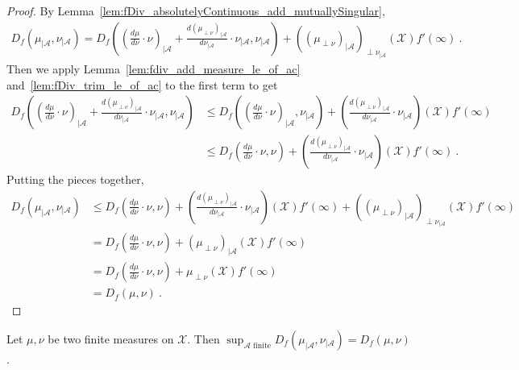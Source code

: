 \begin{proof}
By Lemma~\ref{lem:fDiv_absolutelyContinuous_add_mutuallySingular},
\begin{align*}
D_f(\mu_{| \mathcal A}, \nu_{| \mathcal A})
= D_f\left((\frac{d\mu}{d\nu}\cdot \nu)_{| \mathcal A} + \frac{d (\mu_{\perp \nu})_{| \mathcal A}}{d \nu_{| \mathcal A}} \cdot \nu_{| \mathcal A}, \nu_{| \mathcal A}\right)
  + ((\mu_{\perp \nu})_{| \mathcal A})_{\perp \nu_{| \mathcal A}}(\mathcal X) f'(\infty)
\: .
\end{align*}
Then we apply Lemma~\ref{lem:fdiv_add_measure_le_of_ac} and~\ref{lem:fDiv_trim_le_of_ac} to the first term to get
\begin{align*}
D_f\left((\frac{d\mu}{d\nu}\cdot \nu)_{| \mathcal A} + \frac{d (\mu_{\perp \nu})_{| \mathcal A}}{d \nu_{| \mathcal A}} \cdot \nu_{| \mathcal A}, \nu_{| \mathcal A}\right)
&\le D_f\left((\frac{d\mu}{d\nu}\cdot \nu)_{| \mathcal A}, \nu_{| \mathcal A}\right)
  + \left(\frac{d (\mu_{\perp \nu})_{| \mathcal A}}{d \nu_{| \mathcal A}} \cdot \nu_{| \mathcal A}\right)(\mathcal X) f'(\infty)
\\
&\le D_f\left(\frac{d\mu}{d\nu}\cdot \nu, \nu\right)
  + \left(\frac{d (\mu_{\perp \nu})_{| \mathcal A}}{d \nu_{| \mathcal A}} \cdot \nu_{| \mathcal A}\right)(\mathcal X) f'(\infty)
\: .
\end{align*}
Putting the pieces together,
\begin{align*}
D_f(\mu_{| \mathcal A}, \nu_{| \mathcal A})
&\le D_f\left(\frac{d\mu}{d\nu}\cdot \nu, \nu\right)
  + \left(\frac{d (\mu_{\perp \nu})_{| \mathcal A}}{d \nu_{| \mathcal A}} \cdot \nu_{| \mathcal A}\right)(\mathcal X) f'(\infty)
  + ((\mu_{\perp \nu})_{| \mathcal A})_{\perp \nu_{| \mathcal A}}(\mathcal X) f'(\infty)
\\
&= D_f\left(\frac{d\mu}{d\nu}\cdot \nu, \nu\right)
  + (\mu_{\perp \nu})_{| \mathcal A}(\mathcal X) f'(\infty)
\\
&= D_f\left(\frac{d\mu}{d\nu}\cdot \nu, \nu\right)
  + \mu_{\perp \nu}(\mathcal X) f'(\infty)
\\
&= D_f(\mu, \nu)
\: .
\end{align*}
\end{proof}

\begin{theorem}
  \label{thm:iSup_fDiv_trim}
  Let $\mu, \nu$ be two finite measures on $\mathcal X$. Then
  $\sup_{\mathcal A \text{ finite}} D_f(\mu_{| \mathcal A}, \nu_{| \mathcal A}) = D_f(\mu, \nu)$.
\end{theorem}

